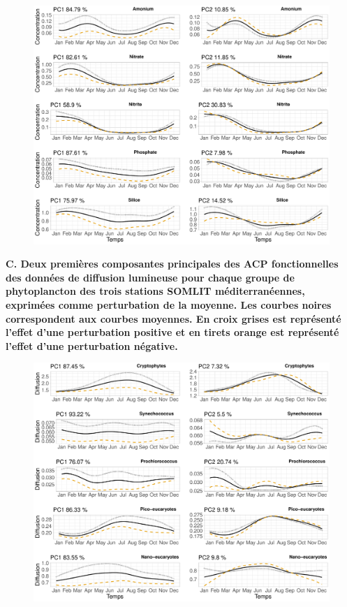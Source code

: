 \documentclass[12pt]{article}
\renewcommand{\thepage}{}
\begin{document}
\begin{appendices}
\begin{figure}
\centering
\includegraphics[width=\textwidth, height=.75\textheight]{fig/ANNEXE_fpca_nut.pdf}
\label{fpca_ab}
\end{figure}

\newpage

{\bfseries C. Deux premières composantes principales des ACP fonctionnelles des données de diffusion lumineuse pour chaque groupe de phytoplancton des trois stations SOMLIT méditerranéennes, exprimées comme perturbation de la moyenne. Les courbes noires correspondent aux courbes moyennes. En croix grises est représenté l’effet d’une perturbation positive et en tirets orange est représenté l’effet d’une perturbation négative. }

\begin{figure}
\centering
\includegraphics[width=\textwidth, height=.75\textheight]{fig/ANNEXE_fpca_diff.pdf}
\label{fpca_ab}
\end{figure}

\end{appendices}

\newpage 
\renewcommand{\thepage}{}

\begin{abstract}

\end{abstract}
\end{document}
